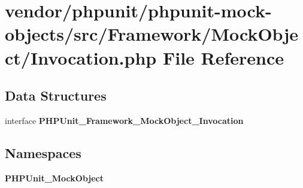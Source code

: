 \section{vendor/phpunit/phpunit-\/mock-\/objects/src/\+Framework/\+Mock\+Object/\+Invocation.php File Reference}
\label{_invocation_8php}
\subsection*{Data Structures}
\begin{DoxyCompactItemize}
\item 
interface {\bf P\+H\+P\+Unit\+\_\+\+Framework\+\_\+\+Mock\+Object\+\_\+\+Invocation}
\end{DoxyCompactItemize}
\subsection*{Namespaces}
\begin{DoxyCompactItemize}
\item 
 {\bf P\+H\+P\+Unit\+\_\+\+Mock\+Object}
\end{DoxyCompactItemize}
